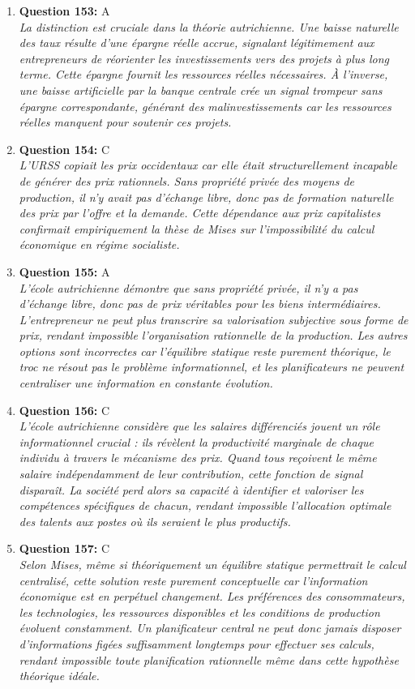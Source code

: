\documentclass[12pt,a4paper]{article}
\begin{document}
\begin{enumerate}
\item \textbf{Question 153:} A
\\ \textit{La distinction est cruciale dans la théorie autrichienne. Une baisse naturelle des taux résulte d'une épargne réelle accrue, signalant légitimement aux entrepreneurs de réorienter les investissements vers des projets à plus long terme. Cette épargne fournit les ressources réelles nécessaires. À l'inverse, une baisse artificielle par la banque centrale crée un signal trompeur sans épargne correspondante, générant des malinvestissements car les ressources réelles manquent pour soutenir ces projets.}

\item \textbf{Question 154:} C
\\ \textit{L'URSS copiait les prix occidentaux car elle était structurellement incapable de générer des prix rationnels. Sans propriété privée des moyens de production, il n'y avait pas d'échange libre, donc pas de formation naturelle des prix par l'offre et la demande. Cette dépendance aux prix capitalistes confirmait empiriquement la thèse de Mises sur l'impossibilité du calcul économique en régime socialiste.}

\item \textbf{Question 155:} A
\\ \textit{L'école autrichienne démontre que sans propriété privée, il n'y a pas d'échange libre, donc pas de prix véritables pour les biens intermédiaires. L'entrepreneur ne peut plus transcrire sa valorisation subjective sous forme de prix, rendant impossible l'organisation rationnelle de la production. Les autres options sont incorrectes car l'équilibre statique reste purement théorique, le troc ne résout pas le problème informationnel, et les planificateurs ne peuvent centraliser une information en constante évolution.}

\item \textbf{Question 156:} C
\\ \textit{L'école autrichienne considère que les salaires différenciés jouent un rôle informationnel crucial : ils révèlent la productivité marginale de chaque individu à travers le mécanisme des prix. Quand tous reçoivent le même salaire indépendamment de leur contribution, cette fonction de signal disparaît. La société perd alors sa capacité à identifier et valoriser les compétences spécifiques de chacun, rendant impossible l'allocation optimale des talents aux postes où ils seraient le plus productifs.}

\item \textbf{Question 157:} C
\\ \textit{Selon Mises, même si théoriquement un équilibre statique permettrait le calcul centralisé, cette solution reste purement conceptuelle car l'information économique est en perpétuel changement. Les préférences des consommateurs, les technologies, les ressources disponibles et les conditions de production évoluent constamment. Un planificateur central ne peut donc jamais disposer d'informations figées suffisamment longtemps pour effectuer ses calculs, rendant impossible toute planification rationnelle même dans cette hypothèse théorique idéale.}


\end{enumerate}
\end{document}
